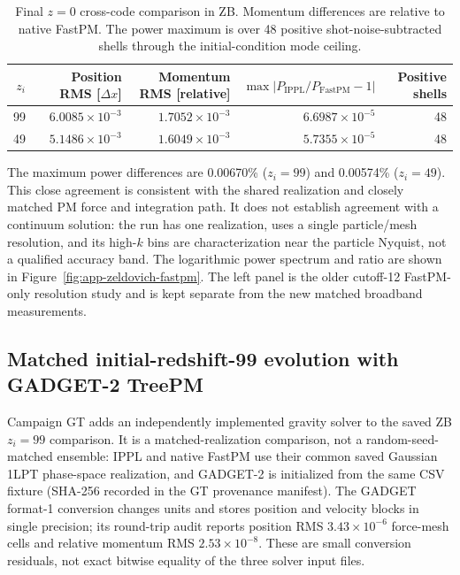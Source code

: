\begin{table}[htbp]
\centering
\small
\caption{Final $z=0$ cross-code comparison in ZB.  Momentum differences are
relative to native FastPM.  The power maximum is over 48 positive
shot-noise-subtracted shells through the initial-condition mode ceiling.}
\label{tab:app-zeldovich-fastpm}
\begin{tabular}{@{}rrrrr@{}}
\toprule
$z_i$ & Position RMS [$\Delta x$] & Momentum RMS [relative] &
  $\max|P_{\mathrm{IPPL}}/P_{\mathrm{FastPM}}-1|$ & Positive shells \\
\midrule
99 & $6.0085\times10^{-3}$ & $1.7052\times10^{-3}$ & $6.6987\times10^{-5}$ & 48 \\
49 & $5.1486\times10^{-3}$ & $1.6049\times10^{-3}$ & $5.7355\times10^{-5}$ & 48 \\
\bottomrule
\end{tabular}
\end{table}

The maximum power differences are 0.00670\% ($z_i=99$) and 0.00574\%
($z_i=49$).  This close agreement is consistent with the shared realization
and closely matched PM force and integration path.  It does not establish
agreement with a continuum solution: the run has one realization, uses a
single particle/mesh resolution, and its high-$k$ bins are characterization
near the particle Nyquist, not a qualified accuracy band.  The logarithmic
power spectrum and ratio are shown in Figure~\ref{fig:app-zeldovich-fastpm}.
The left panel is the older cutoff-12 FastPM-only resolution study and is kept
separate from the new matched broadband measurements.


\subsection{Matched initial-redshift-99 evolution with GADGET-2 TreePM}
\label{app:gadget2-zeldovich}

Campaign GT adds an independently implemented gravity solver to the saved
ZB $z_i=99$ comparison.  It is a matched-realization comparison, not a
random-seed-matched ensemble: IPPL and native FastPM use their common saved
Gaussian 1LPT phase-space realization, and GADGET-2 is initialized from the
same CSV fixture (SHA-256 recorded in the GT provenance manifest).  The GADGET
format-1 conversion changes units and stores position and velocity blocks in
single precision; its round-trip audit reports position RMS
$3.43\times10^{-6}$ force-mesh cells and relative momentum RMS
$2.53\times10^{-8}$.  These are small conversion residuals, not exact
bitwise equality of the three solver input files.

